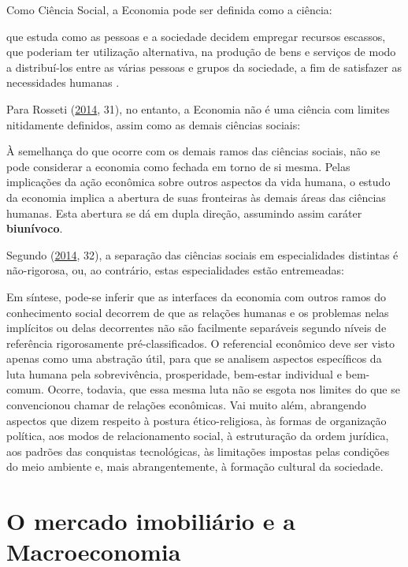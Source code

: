 \documentclass[
	12pt,				%
	oneside,			%
	a4paper,			%
	chapter=TITLE,		%
	section=TITLE,		%
	english,			%
	brazil				%
	]{abntex2}
\begin{document}
Como Ciência Social, a Economia pode ser definida como a ciência:
\begin{citacao}
que estuda como as pessoas e a sociedade decidem empregar recursos escassos, que
poderiam ter utilização alternativa, na produção de bens e serviços de modo a
distribuí-los  entre as várias pessoas e grupos da sociedade, a fim de
satisfazer as necessidades humanas
\cite[p.~5]{passosnogami}.
\end{citacao}
Para Rosseti (\protect\hyperlink{ref-rossetti}{2014}, 31), no entanto, a Economia não é uma ciência com
limites nitidamente definidos, assim como as demais ciências sociais:
\begin{citacao}
À semelhança do que ocorre com os demais ramos das ciências sociais, não se pode
considerar a economia como fechada em torno de si mesma. Pelas implicações da
ação econômica sobre outros aspectos da vida humana, o estudo da economia
implica a abertura de suas fronteiras às demais áreas das ciências humanas. Esta
abertura se dá em dupla direção, assumindo assim caráter \textbf{biunívoco}.
\end{citacao}
Segundo (\protect\hyperlink{ref-rossetti}{2014}, 32), a separação das ciências sociais em
especialidades distintas é não-rigorosa, ou, ao contrário, estas especialidades
estão entremeadas:
\begin{citacao}
Em síntese, pode-se inferir que as interfaces da economia com outros ramos do
conhecimento social decorrem de que as relações humanas e os problemas nelas
implícitos ou delas decorrentes não são facilmente separáveis segundo níveis de
referência rigorosamente pré-classificados. O referencial econômico deve ser
visto apenas como uma abstração útil, para que se analisem aspectos específicos
da luta humana pela sobrevivência, prosperidade, bem-estar individual e
bem-comum. Ocorre, todavia, que essa mesma luta não se esgota nos limites do que
se convencionou chamar de relações econômicas. Vai muito além, abrangendo
aspectos que dizem respeito à postura ético-religiosa, às formas de organização
política, aos modos de relacionamento social, à estruturação da ordem jurídica,
aos padrões das conquistas tecnológicas, às limitações impostas pelas condições
do meio ambiente e, mais abrangentemente, à formação cultural da sociedade.
\end{citacao}
\hypertarget{macro}{%
\section{O mercado imobiliário e a Macroeconomia}\label{macro}}
\end{document}
